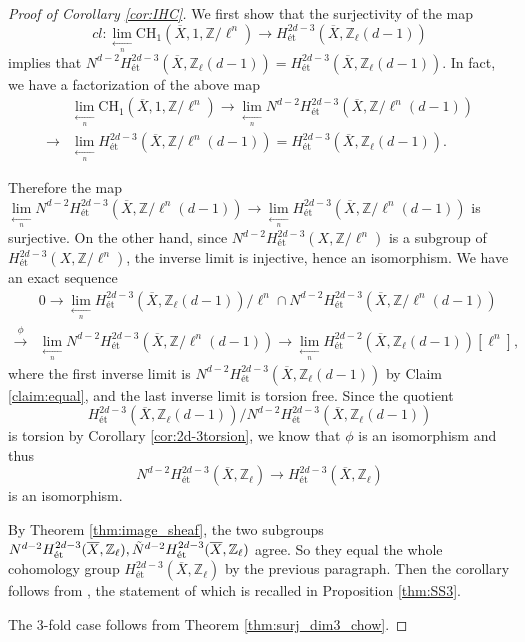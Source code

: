 \documentclass{amsart}
\theoremstyle{definition}
\theoremstyle{remark}
\newcommand{\mbb}{\mathbb}
\newcommand{\ZZ}{\mbb{Z}}
\newcommand{\et}{\text{\'et}}
\begin{document}
\begin{proof}[Proof of Corollary \ref{cor:IHC}]
We first show that  the surjectivity of the map 
\[
cl: \lim \limits_{\xleftarrow[n]{}}\text{CH}_1(\overline{X}, 1, \ZZ/\ell^n) \to H^{2d-3}_{\text{\'et}}(\overline{X}, \ZZ_\ell(d-1))
\]
implies that $N^{d-2}H_\et^{2d-3}(\overline{X}, \ZZ_\ell(d-1))=H_\et^{2d-3}(\overline{X}, \ZZ_\ell(d-1))$.
In fact, we have a factorization of the above map
\begin{align*}
    & \lim \limits_{\xleftarrow[n]{}}\text{CH}_1(\overline{X}, 1, \ZZ/\ell^n) \to \lim \limits_{\xleftarrow[n]{}} N^{d-2}H_\et^{2d-3}(\overline{X}, \ZZ/\ell^n(d-1))\\
    \to & \lim \limits_{\xleftarrow[n]{}}H^{2d-3}_\et(\overline{X}, \ZZ/\ell^n(d-1))= H^{2d-3}_{\text{\'et}}(\overline{X}, \ZZ_\ell(d-1)).
\end{align*}

Therefore the map
$\lim \limits_{\xleftarrow[n]{}} N^{d-2}H_\et^{2d-3}(\overline{X}, \ZZ/\ell^n(d-1)) \to \lim \limits_{\xleftarrow[n]{}}H^{2d-3}_\et(\overline{X}, \ZZ/\ell^n(d-1))$
is surjective. On the other hand, since $N^{d-2}H_\et^{2d-3}(X, \ZZ/\ell^n)$ is a subgroup of $H_\et^{2d-3}(X, \ZZ/\ell^n)$, the inverse limit is injective, hence an isomorphism.
We have an exact sequence
\begin{align*}
 & 0 \to \lim \limits_{\xleftarrow[n]{}} H_\et^{2d-3}(\overline{X}, \ZZ_\ell(d-1))/\ell^n \cap N^{d-2}H_\et^{2d-3}(\overline{X}, \ZZ/\ell^n(d-1))\\
\xrightarrow{\phi} &\lim \limits_{\xleftarrow[n]{}} N^{d-2}H_\et^{2d-3}(\overline{X}, \ZZ/\ell^n(d-1)) \to \lim \limits_{\xleftarrow[n]{}}H^{2d-2}_\et(\overline{X}, \ZZ_\ell(d-1))[\ell^n],
\end{align*}
where the first inverse limit is $N^{d-2}H^{2d-3}_\et(\overline{X}, \ZZ_\ell(d-1))$ by Claim \ref{claim:equal}, and the last inverse limit is torsion free.
Since the quotient
\[
H_\et^{2d-3}(\overline{X}, \ZZ_\ell(d-1))/N^{d-2}H_\et^{2d-3}(\overline{X}, \ZZ_\ell(d-1))
\]
is torsion by Corollary \ref{cor:2d-3torsion}, we know that $\phi$ is an isomorphism and thus 
\[
N^{d-2}H^{2d-3}_\et(\overline{X}, \ZZ_\ell) \to H^{2d-3}_\et(\overline{X}, \ZZ_\ell)
\]is an isomorphism.

By Theorem \ref{thm:image_sheaf}, the two subgroups $N^{d-2}H^{2d-3}_\et(\overline{X}, \ZZ_\ell), \Tilde{N}^{d-2}H^{2d-3}_\et(\overline{X}, \ZZ_\ell)$ agree. So they equal the whole cohomology group $H^{2d-3}_\et(\overline{X}, \ZZ_\ell)$ by the previous paragraph. 
Then the corollary follows from \cite[Proposition 5.6]{ScaviaSuzuki2023coniveau}, the statement of which is recalled in Proposition \ref{thm:SS3}.

The $3$-fold case follows from Theorem \ref{thm:surj_dim3_chow}.
\end{proof}
\end{document}
